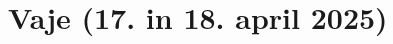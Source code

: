 \documentclass[11pt,a4paper]{exam}
\renewcommand{\{}{\lbrace}
\renewcommand{\}}{\rbrace}
\begin{document}

	






\section*{Vaje (17. in 18. april 2025)}
\end{document}
